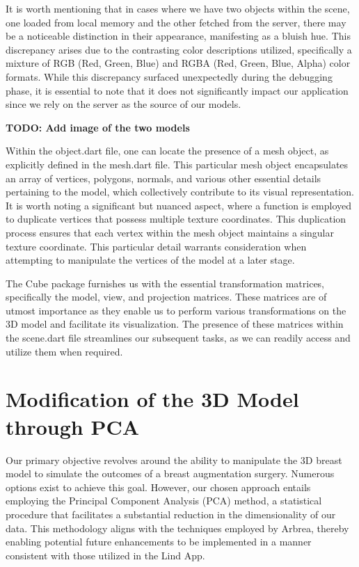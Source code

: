 It is worth mentioning that in cases where we have two objects within the scene, one loaded from local memory and the other fetched from the server, 
there may be a noticeable distinction in their appearance, manifesting as a bluish hue. This discrepancy arises due to the contrasting color descriptions utilized, 
specifically a mixture of RGB (Red, Green, Blue) and RGBA (Red, Green, Blue, Alpha) color formats. While this discrepancy surfaced unexpectedly during 
the debugging phase, it is essential to note that it does not significantly impact our application since we rely on the server as the source of our models.

\textbf{TODO: Add image of the two models}

Within the object.dart file, one can locate the presence of a mesh object, as explicitly defined in the mesh.dart file. This particular mesh object encapsulates an 
array of vertices, polygons, normals, and various other essential details pertaining to the model, which collectively contribute to its visual representation. 
It is worth noting a significant but nuanced aspect, where a function is employed to duplicate vertices that possess multiple texture coordinates. 
This duplication process ensures that each vertex within the mesh object maintains a singular texture coordinate. This particular detail warrants 
consideration when attempting to manipulate the vertices of the model at a later stage.

The Cube package furnishes us with the essential transformation matrices, specifically the model, view, and projection matrices. 
These matrices are of utmost importance as they enable us to perform various transformations on the 3D model and facilitate its visualization. 
The presence of these matrices within the scene.dart file streamlines our subsequent tasks, as we can readily access and utilize them when required.

\section{Modification of the 3D Model through PCA}

Our primary objective revolves around the ability to manipulate the 3D breast model to simulate the outcomes of a breast augmentation surgery. 
Numerous options exist to achieve this goal. However, our chosen approach entails employing the Principal Component Analysis (PCA) method, 
a statistical procedure that facilitates a substantial reduction in the dimensionality of our data. This methodology aligns with the techniques employed by Arbrea, 
thereby enabling potential future enhancements to be implemented in a manner consistent with those utilized in the Lind App.

